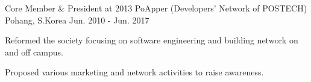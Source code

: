 

\begin{cventries}

  \cventry
    {Core Member \& President at 2013} %
    {PoApper (Developers' Network of POSTECH)} %
    {Pohang, S.Korea} %
    {Jun. 2010 - Jun. 2017} %
    {
      \begin{cvitems} %
        \item {Reformed the society focusing on software engineering and building network on and off campus.}
        \item {Proposed various marketing and network activities to raise awareness.}
      \end{cvitems}
    }

\end{cventries}

